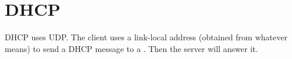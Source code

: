 \section{DHCP}
\label{sec:dhcp}

DHCP uses UDP. The client uses a link-local address (obtained from whatever
means) to send a DHCP message to a . Then the server will answer it.




